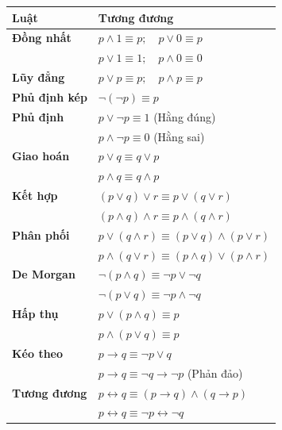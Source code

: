 \documentclass[12pt,a4paper]{article}
\begin{document}
\begin{center}
\renewcommand{\arraystretch}{1.28}
\begin{tabular}{ll}
\toprule
\textbf{Luật} & \textbf{Tương đương} \\
\midrule
\textbf{Đồng nhất} & $p \land 1 \equiv p;\quad p \lor 0 \equiv p$ \\
 & $p \lor 1 \equiv 1;\quad p \land 0 \equiv 0$ \\
\textbf{Lũy đẳng} & $p \lor p \equiv p;\quad p \land p \equiv p$ \\
\textbf{Phủ định kép} & $\neg(\neg p) \equiv p$ \\
\textbf{Phủ định} & $p \lor \neg p \equiv 1$ (Hằng đúng) \\
 & $p \land \neg p \equiv 0$ (Hằng sai) \\
\textbf{Giao hoán} & $p \lor q \equiv q \lor p$ \\
 & $p \land q \equiv q \land p$ \\
\textbf{Kết hợp} & $(p \lor q) \lor r \equiv p \lor (q \lor r)$ \\
 & $(p \land q) \land r \equiv p \land (q \land r)$ \\
\midrule
\textbf{Phân phối} & $p \lor (q \land r) \equiv (p \lor q) \land (p \lor r)$ \\
 & $p \land (q \lor r) \equiv (p \land q) \lor (p \land r)$ \\
\textbf{De Morgan} & $\neg(p \land q) \equiv \neg p \lor \neg q$ \\
 & $\neg(p \lor q) \equiv \neg p \land \neg q$ \\
\textbf{Hấp thụ} & $p \lor (p \land q) \equiv p$ \\
 & $p \land (p \lor q) \equiv p$ \\
\textbf{Kéo theo} & $p \to q \equiv \neg p \lor q$ \\
 & $p \to q \equiv \neg q \to \neg p$ (Phản đảo) \\
\textbf{Tương đương} & $p \leftrightarrow q \equiv (p \to q) \land (q \to p)$ \\
 & $p \leftrightarrow q \equiv \neg p \leftrightarrow \neg q$ \\
\bottomrule
\end{tabular}
\end{center}
\end{document}
